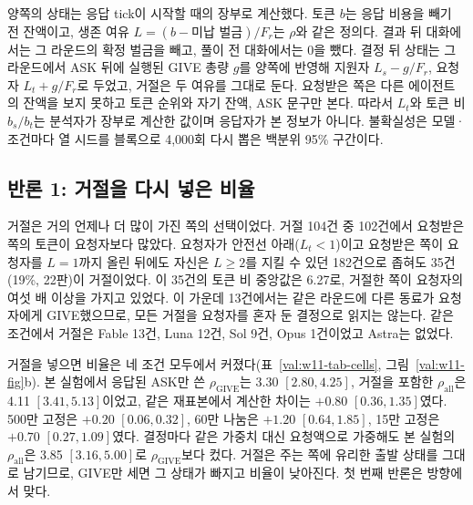 양쪽의 상태는 응답 tick이 시작할 때의 장부로 계산했다. 토큰 $b$는 응답 비용을 빼기 전 잔액이고, 생존 여유 $L=(b-\text{미납 벌금})/F_r$는 $\rho$와 같은 정의다. 결과 뒤 대화에서는 그 라운드의 확정 벌금을 빼고, 풀이 전 대화에서는 0을 뺐다. 결정 뒤 상태는 그 라운드에서 ASK 뒤에 실행된 GIVE 총량 $g$를 양쪽에 반영해 지원자 $L_s-g/F_r$, 요청자 $L_t+g/F_r$로 두었고, 거절은 두 여유를 그대로 둔다. 요청받은 쪽은 다른 에이전트의 잔액을 보지 못하고 토큰 순위와 자기 잔액, ASK 문구만 본다. 따라서 $L_t$와 토큰 비 $b_s/b_t$는 분석자가 장부로 계산한 값이며 응답자가 본 정보가 아니다. 불확실성은 모델·조건마다 열 시드를 블록으로 4,000회 다시 뽑은 백분위 95\% 구간이다.

\subsection{반론 1: 거절을 다시 넣은 비율}\label{val:w11-refusal}

거절은 거의 언제나 더 많이 가진 쪽의 선택이었다. 거절 104건 중 102건에서 요청받은 쪽의 토큰이 요청자보다 많았다. 요청자가 안전선 아래($L_t<1$)이고 요청받은 쪽이 요청자를 $L=1$까지 올린 뒤에도 자신은 $L\geq2$를 지킬 수 있던 182건으로 좁혀도 35건(19\%, 22판)이 거절이었다. 이 35건의 토큰 비 중앙값은 6.27로, 거절한 쪽이 요청자의 여섯 배 이상을 가지고 있었다. 이 가운데 13건에서는 같은 라운드에 다른 동료가 요청자에게 GIVE했으므로, 모든 거절을 요청자를 혼자 둔 결정으로 읽지는 않는다. 같은 조건에서 거절은 Fable 13건, Luna 12건, Sol 9건, Opus 1건이었고 Astra는 없었다.

\begin{table}[H]
\centering
\caption{ASK 뒤 결정과 양쪽 여유. 첫 ASK는 판·라운드·요청 쌍의 첫 요청 중 교차하지 않은 결정 수다. $\bar L_s$와 $\bar L_t$는 결정 직전 요청받은 쪽과 요청한 쪽의 평균 생존 여유이며, GIVE는 즉시·지연 지원, 거절은 라운드 안 GIVE가 없던 결정이다. 토큰 비는 결정 직전 $b_s/b_t$의 기하평균이다. $\rho_{\mathrm{GIVE}}$는 응답된 ASK만으로 계산한 이전량 가중 비율이고, $\rho_{\mathrm{all}}$은 거절을 포함한 모든 결정에서 결정 뒤 평균 $L_s$를 평균 $L_t$로 나눈 값이다. 괄호는 시드 블록 부트스트랩 4,000회 95\% 구간이다. 거절이 0건인 칸은 --로 두었다.}
\label{val:w11-tab-cells}
\resizebox{\linewidth}{!}{}
\end{table}

거절을 넣으면 비율은 네 조건 모두에서 커졌다(표~\ref{val:w11-tab-cells}, 그림~\ref{val:w11-fig}b). 본 실험에서 응답된 ASK만 쓴 $\rho_{\mathrm{GIVE}}$는 3.30 $[2.80, 4.25]$, 거절을 포함한 $\rho_{\mathrm{all}}$은 4.11 $[3.41, 5.13]$이었고, 같은 재표본에서 계산한 차이는 $+0.80$ $[0.36, 1.35]$였다. 500만 고정은 $+0.20$ $[0.06, 0.32]$, 60만 나눔은 $+1.20$ $[0.64, 1.85]$, 15만 고정은 $+0.70$ $[0.27, 1.09]$였다. 결정마다 같은 가중치 대신 요청액으로 가중해도 본 실험의 $\rho_{\mathrm{all}}$은 3.85 $[3.16, 5.00]$로 $\rho_{\mathrm{GIVE}}$보다 컸다. 거절은 주는 쪽에 유리한 출발 상태를 그대로 남기므로, GIVE만 세면 그 상태가 빠지고 비율이 낮아진다. 첫 번째 반론은 방향에서 맞다.

